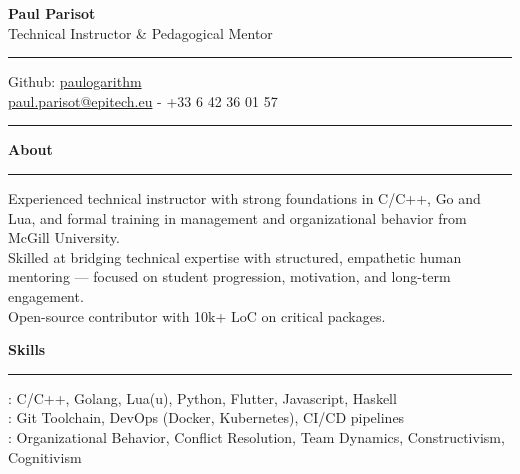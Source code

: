 \documentclass{article}
\begin{document}
\begin{center}
    {\huge\bfseries Paul Parisot}
    \\[10pt]
    {\Large Technical Instructor \& Pedagogical Mentor}
    \\
\end{center}

\par\vspace{-10pt}
\rule{\linewidth}{0.4pt}
\par\vspace{-10pt}

\begin{center}
    Github: \href{https://github.com/paulogarithm}{paulogarithm}
    \\
    \href{mailto:paul.parisot@epitech.eu}{paul.parisot@epitech.eu} - +33 6 42 36 01 57
    \\
\end{center}

\par\vspace{-15pt}
\rule{\linewidth}{0.4pt}
\par\vspace{5pt}

{\large\bfseries About}
\par\vspace{-8pt}
\rule{\linewidth}{0.4pt}
\par\vspace{5pt}

Experienced technical instructor with strong foundations in C/C++, Go and Lua, and formal training in management and organizational behavior from McGill University.
\\
Skilled at bridging technical expertise with structured, empathetic human mentoring — focused on student progression, motivation, and long-term engagement.
\\
Open-source contributor with 10k+ LoC on critical packages.
\par\vspace{5pt}

{\large\bfseries Skills}
\par\vspace{-8pt}
\rule{\linewidth}{0.4pt}
\par\vspace{5pt}

\hspace*{5pt}{\bfseries Technical}: C/C++, Golang, Lua(u), Python, Flutter, Javascript, Haskell
\\
\hspace*{5pt}{\bfseries DevOps \& Tools}: Git Toolchain, DevOps (Docker, Kubernetes), CI/CD pipelines
\\
\hspace*{5pt}{\bfseries Pedagogy \& Management}: Organizational Behavior, Conflict Resolution, Team Dynamics, Constructivism, Cognitivism
\end{document}
